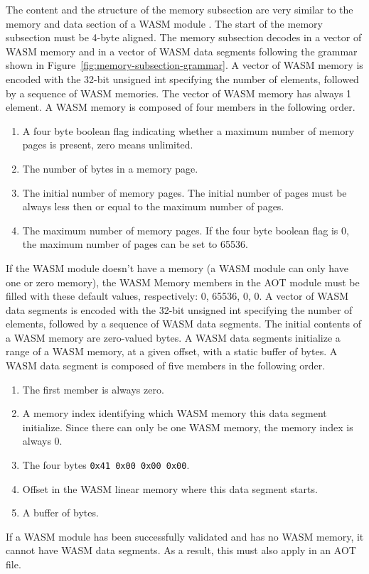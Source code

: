 \documentclass{article}
\begin{document}
The content and the structure of the memory subsection are very similar to the memory and data section of a WASM module \cite[Secs.~5.5.8 and 5.5.14]{webassembly2019core}.
The start of the memory subsection must be 4-byte aligned.
The memory subsection decodes in a vector of WASM memory and in a vector of WASM data segments following the grammar shown in Figure~\ref{fig:memory-subsection-grammar}.
A vector of WASM memory is encoded with the 32-bit unsigned int specifying the number of elements, followed by a sequence of WASM memories.
The vector of WASM memory has always 1 element.
A WASM memory is composed of four members in the following order.
\begin{enumerate}
    \item A four byte boolean flag indicating whether a maximum number of memory pages is present, zero means unlimited.
    \item The number of bytes in a memory page.
    \item The initial number of memory pages. The initial number of pages must be always less then or equal to the maximum number of pages.

    \item The maximum number of memory pages. If the four byte boolean flag is 0, the maximum number of pages can be set to 65536.
\end{enumerate}
If the WASM module doesn't have a memory (a WASM module can only have one or zero memory), the WASM Memory members in the AOT module must be filled with these default values, respectively: 0, 65536, 0, 0.
A vector of WASM data segments is encoded with the 32-bit unsigned int specifying the number of elements, followed by a sequence of WASM data segments.
The initial contents of a WASM memory are zero-valued bytes.
A WASM data segments initialize a range of a WASM memory, at a given offset, with a static buffer of bytes.
A WASM data segment is composed of five members in the following order.
\begin{enumerate}
    \item The first member is always zero.
    \item A memory index identifying which WASM memory this data segment initialize.
        Since there can only be one WASM memory, the memory index is always 0.
    \item The four bytes \verb"0x41 0x00 0x00 0x00".
    \item Offset in the WASM linear memory where this data segment starts.
    \item A buffer of bytes.
\end{enumerate}
If a WASM module has been successfully validated and has no WASM memory, it cannot have WASM data segments.
As a result, this must also apply in an AOT file.
\end{document}
